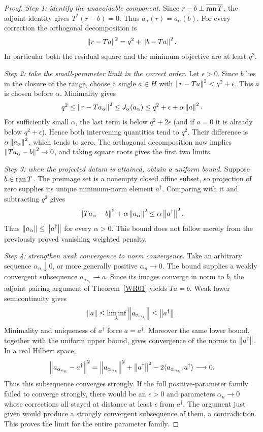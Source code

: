 \begin{proof}
\emph{Step 1: identify the unavoidable component.} Since $r-b\perp\overline{\operatorname{ran} T}$, the adjoint identity gives $T^*(r-b)=0$. Thus $a_\alpha(r)=a_\alpha(b)$. For every correction the orthogonal decomposition is
\[
 \left\lVert r-Ta\right\rVert^2=q^2+\left\lVert b-Ta\right\rVert^2.
\]
In particular both the residual square and the minimum objective are at least $q^2$.

\emph{Step 2: take the small-parameter limit in the correct order.} Let $\epsilon>0$. Since $b$ lies in the closure of the range, choose a single $a\in H$ with $\left\lVert r-Ta\right\rVert^2<q^2+\epsilon$. This $a$ is chosen before $\alpha$. Minimality gives
\[
 q^2\le\left\lVert r-Ta_\alpha\right\rVert^2
 \le J_\alpha(a_\alpha)
 \le q^2+\epsilon+\alpha\left\lVert a\right\rVert^2.
\]
For sufficiently small $\alpha$, the last term is below $q^2+2\epsilon$ (and if $a=0$ it is already below $q^2+\epsilon$). Hence both intervening quantities tend to $q^2$. Their difference is $\alpha\left\lVert a_\alpha\right\rVert^2$, which tends to zero. The orthogonal decomposition now implies $\left\lVert Ta_\alpha-b\right\rVert^2\to0$, and taking square roots gives the first two limits.

\emph{Step 3: when the projected datum is attained, obtain a uniform bound.} Suppose $b\in\operatorname{ran} T$. The preimage set is a nonempty closed affine subset, so projection of zero supplies its unique minimum-norm element $a^\dagger$. Comparing with it and subtracting $q^2$ gives
\[
 \left\lVert Ta_\alpha-b\right\rVert^2+\alpha\left\lVert a_\alpha\right\rVert^2
 \le\alpha\left\lVert a^\dagger\right\rVert^2.
\]
Thus $\left\lVert a_\alpha\right\rVert\le\left\lVert a^\dagger\right\rVert$ for every $\alpha>0$. This bound does not follow merely from the previously proved vanishing weighted penalty.

\emph{Step 4: strengthen weak convergence to norm convergence.} Take an arbitrary sequence $\alpha_n\downarrow0$, or more generally positive $\alpha_n\to0$. The bound supplies a weakly convergent subsequence $a_{\alpha_{n_k}}\rightharpoonup a$. Since its images converge in norm to $b$, the adjoint pairing argument of Theorem~\ref{WR01} yields $Ta=b$. Weak lower semicontinuity gives
\[
 \left\lVert a\right\rVert\le\liminf_k\left\lVert a_{\alpha_{n_k}}\right\rVert
 \le\left\lVert a^\dagger\right\rVert.
\]
Minimality and uniqueness of $a^\dagger$ force $a=a^\dagger$. Moreover the same lower bound, together with the uniform upper bound, gives convergence of the norms to $\left\lVert a^\dagger\right\rVert$. In a real Hilbert space,
\[
 \left\lVert a_{\alpha_{n_k}}-a^\dagger\right\rVert^2
 =\left\lVert a_{\alpha_{n_k}}\right\rVert^2+\left\lVert a^\dagger\right\rVert^2
       -2\langle a_{\alpha_{n_k}},a^\dagger\rangle\longrightarrow0.
\]
Thus this subsequence converges strongly. If the full positive-parameter family failed to converge strongly, there would be an $\epsilon>0$ and parameters $\alpha_n\to0$ whose corrections all stayed at distance at least $\epsilon$ from $a^\dagger$. The argument just given would produce a strongly convergent subsequence of them, a contradiction. This proves the limit for the entire parameter family.


\end{proof}
